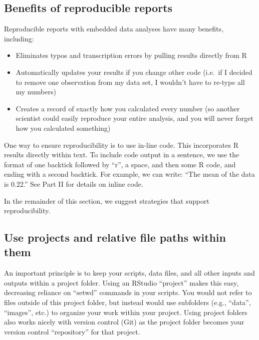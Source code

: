 \documentclass[
]{article}
\begin{document}
\hypertarget{benefits-of-reproducible-reports}{%
\subsection{Benefits of reproducible
reports}\label{benefits-of-reproducible-reports}}

Reproducible reports with embedded data analyses have many benefits,
including:

\begin{itemize}
\item
  Eliminates typos and transcription errors by pulling results directly
  from R
\item
  Automatically updates your results if you change other code (i.e.~if I
  decided to remove one observation from my data set, I wouldn't have to
  re-type all my numbers)
\item
  Creates a record of exactly how you calculated every number (so
  another scientist could easily reproduce your entire analysis, and you
  will never forget how you calculated something)
\end{itemize}

One way to ensure reproducibility is to use in-line code. This
incorporates R results directly within text. To include code output in a
sentence, we use the format of one backtick followed by ``r'', a space,
and then some R code, and ending with a second backtick. For example, we
can write: ``The mean of the data is 0.22.'' See Part II for details on
inline code.

In the remainder of this section, we suggest strategies that support
reproducibility.

\hypertarget{use-projects-and-relative-file-paths-within-them}{%
\subsection{Use projects and relative file paths within
them}\label{use-projects-and-relative-file-paths-within-them}}

An important principle is to keep your scripts, data files, and all
other inputs and outputs within a project folder. Using an RStudio
``project'' makes this easy, decreasing reliance on ``setwd'' commands
in your scripts. You would not refer to files outside of this project
folder, but instead would use subfolders (e.g., ``data'', ``images'',
etc.) to organize your work within your project. Using project folders
also works nicely with version control (Git) as the project folder
becomes your version control ``repository'' for that project.
\end{document}
